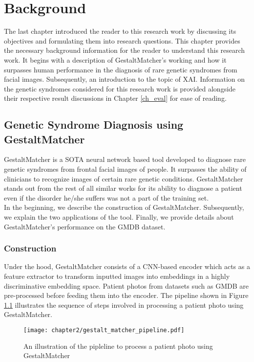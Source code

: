 \documentclass[../report.tex]{subfiles}
\begin{document}
    \chapter{Background}\label{chap_background}
    \noindent
	The last chapter introduced the reader to this research work by discussing its objectives and formulating them into research questions. This chapter provides the necessary background information for the reader to understand this research work. It begins with a description of GestaltMatcher's working and how it surpasses human performance in the diagnosis of rare genetic syndromes from facial images. Subsequently, an introduction to the topic of XAI. Information on the genetic syndromes considered for this research work is provided alongside their respective result discussions in Chapter \ref{ch_eval}  for ease of reading. 
    \section{Genetic Syndrome Diagnosis using GestaltMatcher}
    \noindent
    GestaltMatcher is a SOTA neural network based tool developed to diagnose rare genetic syndromes from frontal facial images of people. It surpasses the ability of clinicians to recognize images of certain rare genetic conditions. GestaltMatcher stands out from the rest of all similar works for its ability to diagnose a patient even if the disorder he/she suffers was not a part of the training set.\\ 
    In the beginning, we describe the construction of GestaltMatcher. Subsequently, we explain the two applications of the tool. Finally, we provide details about GestaltMatcher's performance on the GMDB dataset.     
    \subsection{Construction}
    \noindent
    Under the hood, GestaltMatcher consists of a CNN-based encoder which acts as a feature extractor
    to transform inputted images into embeddings in a highly discriminative embedding space. Patient photos from datasets such as GMDB are pre-processed before feeding them into the encoder.
    The pipeline shown in Figure \ref{fig_gm_pipeline_ch2} illustrates the sequence of steps involved in processing a patient photo using GestaltMatcher.
    \begin{figure}[ht]
    	\hspace*{-0.5cm}      
    	\texttt{[image: chapter2/gestalt\_matcher\_pipeline.pdf]}
    	\caption{An illustration of the pipleline to process a patient photo using GestaltMatcher}
    	\label{fig_gm_pipeline_ch2}
    \end{figure}
    
\end{document}
